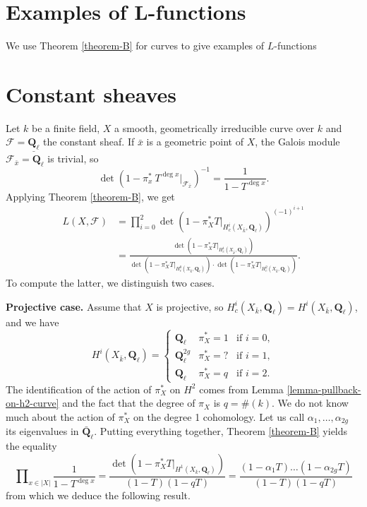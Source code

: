 \section{Examples of L-functions}
\label{section-examples-L-functions}

\noindent
We use Theorem \ref{theorem-B} for curves to give examples of $L$-functions





\section{Constant sheaves}
\label{section-L-function-constant-sheaf}

\noindent
Let $k$ be a finite field, $X$ a smooth, geometrically irreducible curve over
$k$ and $\mathcal{F} = \underline{\mathbf{Q}_\ell}$ the constant sheaf. If
$\bar x$ is a geometric point of $X$, the Galois module
$\mathcal{F}_{\bar x} = \mathbf{Q}_\ell$ is trivial, so
$$
\det(1-\pi_x^*\ T^{\deg x} |_{\mathcal{F}_{\bar x}})^{-1} =
\frac{1}{1-T^{\deg x}}.
$$
Applying Theorem \ref{theorem-B}, we get
\begin{align*}
L(X, \mathcal{F})
& =
\prod_{i = 0}^2
\det(1 - \pi_X^*T |_{H_c^i(X_{\bar k}, \mathbf{Q}_\ell)})^{(-1)^{i+1}} \\
& =
\frac{\det(1 - \pi_X^*T |_{H_c^1(X_{\bar k}, \mathbf{Q}_\ell)})}{
\det(1 - \pi_X^*T |_{H_c^0(X_{\bar k}, \mathbf{Q}_\ell)})
\cdot \det(1 - \pi_X^*T |_{H_c^2(X_{\bar k}, \mathbf{Q}_\ell)})}.
\end{align*}
To compute the latter, we distinguish two cases.


\medskip\noindent
{\bf Projective case.}
Assume that $X$ is projective, so $H_c^i(X_{\bar k}, \mathbf{Q}_\ell) =
H^i(X_{\bar k}, \mathbf{Q}_\ell)$, and we have
$$
H^i(X_{\bar k}, \mathbf{Q}_\ell) =
\left\{
\begin{matrix}
\mathbf{Q}_\ell & \pi_X^* = 1 & \text{if }i = 0, \\
\mathbf{Q}_\ell^{2g} & \pi_X^* = ? & \text{if }i = 1, \\
\mathbf{Q}_\ell & \pi_X^* = q & \text{if }i = 2.
\end{matrix}
\right.
$$
The identification of the action of $\pi_X^*$ on $H^2$ comes from
Lemma \ref{lemma-pullback-on-h2-curve} and the fact that the degree
of $\pi_X$ is $q = \#(k)$.
We do not know much about the action of $\pi_X^*$ on the degree 1 cohomology.
Let us call $\alpha_1, \ldots, \alpha_{2g}$ its eigenvalues in
$\bar{\mathbf{Q}}_\ell$. Putting everything together,
Theorem \ref{theorem-B}
yields the equality
$$
\prod\nolimits_{x \in |X|} \frac{1}{1 - T^{\deg x}} =
\frac{\det(1- \pi_X^* T|_{H^1(X_{\bar k}, \mathbf{Q}_\ell)})}{(1-T)(1-qT)} =
\frac{(1 - \alpha_1 T) \ldots (1 - \alpha_{2g}T)}{(1-T)(1-qT)}
$$
from which we deduce the following result.

